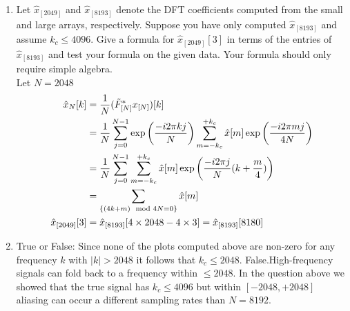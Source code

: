 \documentclass[12pt,twoside]{article}
\begin{document}
\begin{enumerate}
\begin{enumerate}
  \item Let $\hat{x}_{[2049]}$ and $\hat{x}_{[8193]}$ denote the DFT
    coefficients computed from the small and large arrays, respectively.
    Suppose you have only computed $\hat{x}_{[8193]}$
    and assume $k_c\leq4096$.
    Give a formula for $\hat{x}_{[2049]}[3]$ in terms of
    the entries of $\hat{x}_{[8193]}$ and test your formula
    on the given data.  Your formula should only require simple algebra. \\
    Let $N=2048$
    \begin{align*}
    	\hat{x}_{N}[k]	&=	\frac{1}{N} (\tilde{F}^*_{[N]} x_{[N]})[k] \\
				&=	\frac{1}{N} \sum_{j=0}^{N-1} \exp \left(  \frac{ - i2 \pi kj}{N}  \right) \sum_{m=-k_c}^{+k_c} \hat{x}[m] \exp \left(  \frac{ - i2 \pi mj}{4 N}  \right)\\		
				&=	\frac{1}{N} \sum_{j=0}^{N-1}  \sum_{m=-k_c}^{+k_c}  \hat{x}[m]  \exp \left(   \frac{ - i2 \pi j}{N} (k + \frac{m}{4})  \right) \\
				&=    \sum_{\{(4 k + m) \mod 4 N = 0\} } \hat{x}[m] \\
      \hat{x}_{[2049]}[3]	&= \hat{x}_{[8193]}[4 \times 2048 - 4 \times 3] =  \hat{x}_{[8193]}[8180]\\
    \end{align*}
    
    
  \item True or False: Since none of the plots computed above are non-zero for
    any frequency $k$ with $|k|>2048$ it follows that
    $k_c\leq2048$. %
    False.High-frequency signals can fold back to a frequency within  $\leq2048$. In the question above we showed that the true signal has 
    $k_c\leq4096$ but within  $[-2048, +2048]$ aliasing can occur a different sampling rates than $N=8192$.
    
  \end{enumerate}


\end{enumerate}
\end{document}
